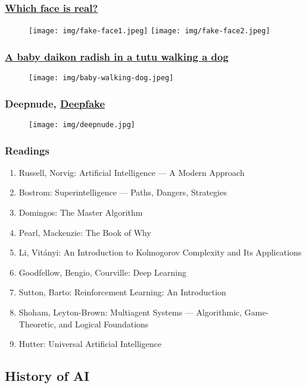 \documentclass[UTF8,11pt,colorlinks,compress,openany]{beamer}%
\begin{document}
\begin{frame}\frametitle{\href{https://www.whichfaceisreal.com/}{Which face is real?}}
\begin{figure}[H]
\texttt{[image: img/fake-face1.jpeg]}
\texttt{[image: img/fake-face2.jpeg]}
\end{figure}
\end{frame}

\begin{frame}\frametitle{\href{https://openai.com/blog/dall-e/}{A baby daikon radish in a tutu walking a dog}}
\begin{figure}[H]
\texttt{[image: img/baby-walking-dog.jpeg]}
\end{figure}
\end{frame}

\begin{frame}\frametitle{Deepnude, \href{https://www.bilibili.com/video/BV1UC4y1t7zN}{Deepfake}}
\begin{figure}[H]
\texttt{[image: img/deepnude.jpg]}
\end{figure}
\end{frame}

\begin{frame}\frametitle{Readings}
\begin{enumerate}
	\item Russell, Norvig: Artificial Intelligence --- A Modern Approach
	\item Bostrom: Superintelligence --- Paths, Dangers, Strategies
	\item Domingos: The Master Algorithm
	\item Pearl, Mackenzie: The Book of Why
	\item Li, Vit\'anyi: An Introduction to Kolmogorov Complexity and Its Applications
	\item Goodfellow, Bengio, Courville: Deep Learning
	\item Sutton, Barto: Reinforcement Learning: An Introduction
	\item Shoham, Leyton-Brown: Multiagent Systems --- Algorithmic, Game-Theoretic, and Logical Foundations
	\item Hutter: Universal Artificial Intelligence
\end{enumerate}
\end{frame}

\subsection{History of AI}
\end{document}
